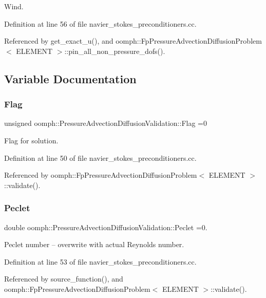 Wind. 



Definition at line 56 of file navier\+\_\+stokes\+\_\+preconditioners.\+cc.



Referenced by get\+\_\+exact\+\_\+u(), and oomph\+::\+Fp\+Pressure\+Advection\+Diffusion\+Problem$<$ E\+L\+E\+M\+E\+N\+T $>$\+::pin\+\_\+all\+\_\+non\+\_\+pressure\+\_\+dofs().



\subsection{Variable Documentation}
\mbox{\label{namespaceoomph_1_1PressureAdvectionDiffusionValidation_aa0684ebcce5057df03bfcdecdc3e70f3}} 
\subsubsection{\texorpdfstring{Flag}{Flag}}
{\footnotesize\ttfamily unsigned oomph\+::\+Pressure\+Advection\+Diffusion\+Validation\+::\+Flag =0}



Flag for solution. 



Definition at line 50 of file navier\+\_\+stokes\+\_\+preconditioners.\+cc.



Referenced by oomph\+::\+Fp\+Pressure\+Advection\+Diffusion\+Problem$<$ E\+L\+E\+M\+E\+N\+T $>$\+::validate().

\mbox{\label{namespaceoomph_1_1PressureAdvectionDiffusionValidation_aec6b0be7e95a7eba69e8aefe0921a5e5}} 
\subsubsection{\texorpdfstring{Peclet}{Peclet}}
{\footnotesize\ttfamily double oomph\+::\+Pressure\+Advection\+Diffusion\+Validation\+::\+Peclet =0.}



Peclet number -- overwrite with actual Reynolds number. 



Definition at line 53 of file navier\+\_\+stokes\+\_\+preconditioners.\+cc.



Referenced by source\+\_\+function(), and oomph\+::\+Fp\+Pressure\+Advection\+Diffusion\+Problem$<$ E\+L\+E\+M\+E\+N\+T $>$\+::validate().

